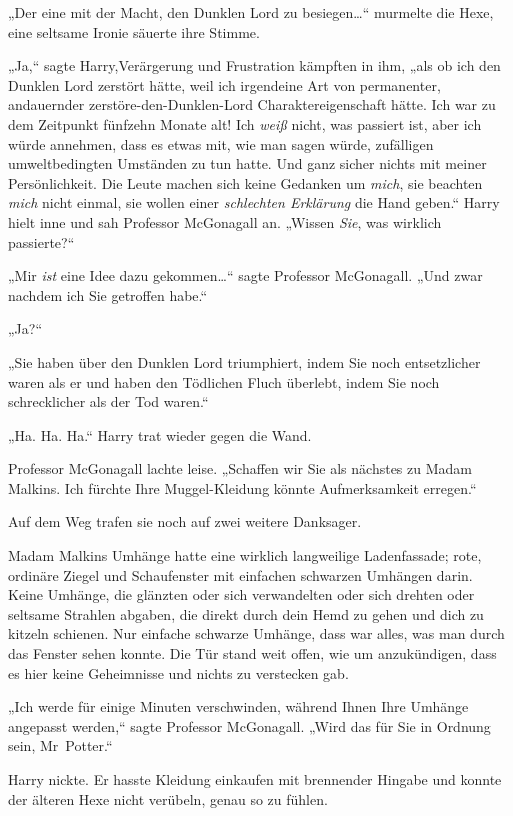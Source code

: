 {„Der eine mit der Macht, den Dunklen Lord zu besiegen…“ murmelte die Hexe, eine seltsame Ironie säuerte ihre Stimme.

„Ja,“ sagte Harry,Verärgerung und Frustration kämpften in ihm, „als ob ich den Dunklen Lord zerstört hätte, weil ich irgendeine Art von permanenter, andauernder zerstöre-den-Dunklen-Lord Charaktereigenschaft hätte. Ich war zu dem Zeitpunkt fünfzehn Monate alt! Ich \emph{weiß} nicht, was passiert ist, aber ich würde annehmen, dass es etwas mit, wie man sagen würde, zufälligen umweltbedingten Umständen zu tun hatte. Und ganz sicher nichts mit meiner Persönlichkeit. Die Leute machen sich keine Gedanken um \emph{mich}, sie beachten \emph{mich} nicht einmal, sie wollen einer \emph{schlechten Erklärung} die Hand geben.“ Harry hielt inne und sah Professor McGonagall an. „Wissen \emph{Sie}, was wirklich passierte?“

„Mir \emph{ist} eine Idee dazu gekommen…“ sagte Professor McGonagall. „Und zwar nachdem ich Sie getroffen habe.“

„Ja?“

„Sie haben über den Dunklen Lord triumphiert, indem Sie noch entsetzlicher waren als er und haben den Tödlichen Fluch überlebt, indem Sie noch schrecklicher als der Tod waren.“

„Ha. Ha. Ha.“ Harry trat wieder gegen die Wand.

Professor McGonagall lachte leise. „Schaffen wir Sie als nächstes zu Madam Malkins. Ich fürchte Ihre Muggel-Kleidung könnte Aufmerksamkeit erregen.“

Auf dem Weg trafen sie noch auf zwei weitere Danksager.

Madam Malkins Umhänge hatte eine wirklich langweilige Ladenfassade; rote, ordinäre Ziegel und Schaufenster mit einfachen schwarzen Umhängen darin. Keine Umhänge, die glänzten oder sich verwandelten oder sich drehten oder seltsame Strahlen abgaben, die direkt durch dein Hemd zu gehen und dich zu kitzeln schienen. Nur einfache schwarze Umhänge, dass war alles, was man durch das Fenster sehen konnte. Die Tür stand weit offen, wie um anzukündigen, dass es hier keine Geheimnisse und nichts zu verstecken gab.

„Ich werde für einige Minuten verschwinden, während Ihnen Ihre Umhänge angepasst werden,“ sagte Professor McGonagall. „Wird das für Sie in Ordnung sein, Mr~Potter.“

Harry nickte. Er hasste Kleidung einkaufen mit brennender Hingabe und konnte der älteren Hexe nicht verübeln, genau so zu fühlen.

}
